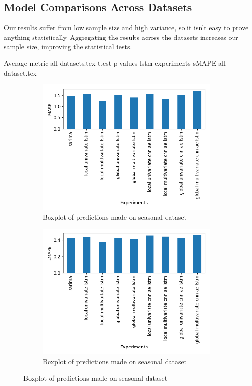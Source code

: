 \subsection{Model Comparisons Across Datasets}
Our results suffer from low sample size and high variance, so it isn't easy
to prove anything statistically. Aggregating the results across the datasets
increases our sample size, improving the statistical tests.

{Average-metric-all-datasets.tex}
{ttest-p-values-lstm-experiments-sMAPE-all-dataset.tex}
\begin{figure}
  \begin{subfigure}[b]{0.49\textwidth}
    \includegraphics[width=\textwidth]{./figs/results/barplot/MASE-all-dataset.png}
    \hfill
    \caption{Boxplot of predictions made on seasonal dataset}
  \end{subfigure}
  \begin{subfigure}[b]{0.49\textwidth}
    \includegraphics[width=\textwidth]{./figs/results/barplot/sMAPE-all-dataset.png}
    \hfill
    \caption{Boxplot of predictions made on seasonal dataset}

  \end{subfigure}
\end{figure}

